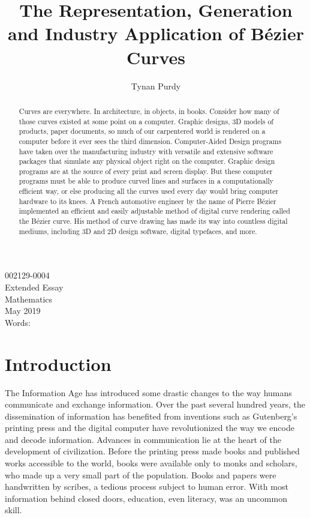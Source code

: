 \documentclass[12pt,letterpaper]{article}
\title{The Representation, Generation and Industry Application of B\'ezier Curves}
\author{Tynan Purdy}
\date{\vspace{-5ex}}
\begin{document}
\large
\parindent=0.5in
{\fontsize{12}{14.4}
	{\singlespace
	\maketitle
	\begin{center}
	\vspace{4mm}
	002129-0004 \\
	\vspace{4mm}
	Extended Essay \\
	\vspace{4mm}
	Mathematics \\
	\vspace{4mm}
	May 2019 \\
	\vspace{4mm}
	Words: \\
	\end{center}
	}
}	

\newpage
{}
\begin{abstract}
Curves are everywhere. In architecture, in objects, in books. Consider how many of those curves existed at some point on a computer. Graphic designs, 3D models of products, paper documents, so much of our carpentered world is rendered on a computer before it ever sees the third dimension. Computer-Aided Design programs have taken over the manufacturing industry with versatile and extensive software packages that simulate any physical object right on the computer. Graphic design programs are at the source of every print and screen display. But these computer programs must be able to produce curved lines and surfaces in a computationally efficient way, or else producing all the curves used every day would bring computer hardware to its knees. A French automotive engineer by the name of Pierre B\'ezier implemented an efficient and easily adjustable method of digital curve rendering called the B\'ezier curve. His method of curve drawing has made its way into countless digital mediums, including 3D and 2D design software, digital typefaces, and more.
\end{abstract}

\newpage
\tableofcontents

\newpage
\section{Introduction}
The Information Age has introduced some drastic changes to the way humans communicate and exchange information. Over the past several hundred years, the dissemination of information has benefited from inventions such as Gutenberg’s printing press and the digital computer have revolutionized the way we encode and decode information. Advances in communication lie at the heart of the development of civilization. Before the printing press made books and published works accessible to the world, books were available only to monks and scholars, who made up a very small part of the population. Books and papers were handwritten by scribes, a tedious process subject to human error. With most information behind closed doors, education, even literacy, was an uncommon skill. 
\end{document}
